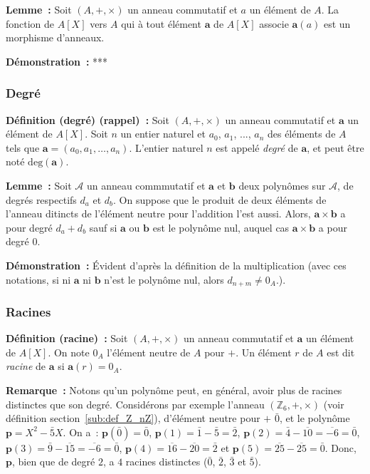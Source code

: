 \medskip

\noindent\textbf{Lemme :} Soit $(A, +, \times)$ un anneau commutatif et $a$ un élément de $A$.
    La fonction de $A[X]$ vers $A$ qui à tout élément $\mathbf{a}$ de $A[X]$ associe $\mathbf{a}(a)$ est un morphisme d'anneaux.

\medskip

\noindent\textbf{Démonstration :} ***

\subsubsection{Degré}

\noindent\textbf{Définition (degré) (rappel) :} Soit $(A, +, \times)$ un anneau commutatif et $\mathbf{a}$ un élément de $A[X]$.
    Soit $n$ un entier naturel et $a_0$, $a_1$, ..., $a_n$ des éléments de $A$ tels que $\mathbf{a} = (a_0, a_1, \dots, a_n)$.
    L'entier naturel $n$ est appelé \textit{degré} de $\mathbf{a}$, et peut être noté $\mathrm{deg}(\mathbf{a})$. 
\medskip

\noindent\textbf{Lemme :} Soit $\mathcal{A}$ un anneau commmutatif et $\mathbf{a}$ et $\mathbf{b}$ deux polynômes sur $\mathcal{A}$, de degrés respectifs $d_a$ et $d_b$. 
    On suppose que le produit de deux éléments de l'anneau ditincts de l'élément neutre pour l'addition l'est aussi.
    Alors, $\mathbf{a} \times \mathbf{b}$ a pour degré $d_a + d_b$ sauf si $\mathbf{a}$ ou $\mathbf{b}$ est le polynôme nul, auquel cas $\mathbf{a} \times \mathbf{b}$ a pour degré $0$.

\medskip

\noindent\textbf{Démonstration :} Évident d'après la définition de la multiplication (avec ces notations, si ni $\mathbf{a}$ ni $\mathbf{b}$ n'est le polynôme nul, alors $d_{n+m} \neq 0_A$.).

\subsubsection{Racines}

\noindent\textbf{Définition (racine) :} Soit $(A, +, \times)$ un anneau commutatif et $\mathbf{a}$ un élément de $A[X]$.
    On note $0_A$ l'élément neutre de $A$ pour $+$.
    Un élément $r$ de $A$ est dit \textit{racine} de $\mathbf{a}$ si $\mathbf{a}(r) = 0_A$.

\medskip

\noindent\textbf{Remarque :} Notons qu'un polynôme peut, en général, avoir plus de racines distinctes que son degré. 
    Considérons par exemple l'anneau $(\mathbb{Z}_6, +, \times)$ (voir définition section~\ref{sub:def_Z_nZ}), d'élément neutre pour $+$ $\bar{0}$, et le polynôme $\mathbf{p} = X^2 - \bar{5} X$. 
    On a : $\mathbf{p}(\bar{0}) = \bar{0}$, $\mathbf{p}(1) = \bar{1} - \bar{5} = \bar{2}$, $\mathbf{p}(2) = \bar{4} - \overline{10} = \overline{-6} = \bar{0}$, $\mathbf{p}(3) = \bar{9} - \overline{15} = \overline{-6} = \bar{0}$, $\mathbf{p}(4) = \overline{16} - \overline{20} = \bar{2}$ et $\mathbf{p}(5) = \overline{25} - \overline{25} = \bar{0}$. 
    Donc, $\mathbf{p}$, bien que de degré $2$, a $4$ racines distinctes ($\bar{0}$, $\bar{2}$, $\bar{3}$ et $\bar{5}$).

